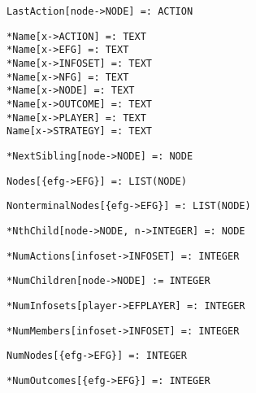 \protect \large \begin{verbatim} 
LastAction[node->NODE] =: ACTION
\end{verbatim}\normalsize

\protect \large \begin{verbatim}
*Name[x->ACTION] =: TEXT
*Name[x->EFG] =: TEXT
*Name[x->INFOSET] =: TEXT
*Name[x->NFG] =: TEXT
*Name[x->NODE] =: TEXT
*Name[x->OUTCOME] =: TEXT
*Name[x->PLAYER] =: TEXT
Name[x->STRATEGY] =: TEXT
\end{verbatim}\normalsize

\protect \large \begin{verbatim}
*NextSibling[node->NODE] =: NODE
\end{verbatim}\normalsize

\protect \large \begin{verbatim} 
Nodes[{efg->EFG}] =: LIST(NODE)
\end{verbatim}\normalsize

\protect \large \begin{verbatim} 
NonterminalNodes[{efg->EFG}] =: LIST(NODE)
\end{verbatim}\normalsize

\protect \large \begin{verbatim} 
*NthChild[node->NODE, n->INTEGER] =: NODE
\end{verbatim}\normalsize

\protect \large \begin{verbatim}
*NumActions[infoset->INFOSET] =: INTEGER
\end{verbatim}\normalsize

\protect \large \begin{verbatim}
*NumChildren[node->NODE] := INTEGER
\end{verbatim}\normalsize

\protect \large \begin{verbatim}
*NumInfosets[player->EFPLAYER] =: INTEGER
\end{verbatim}\normalsize

\protect \large \begin{verbatim}
*NumMembers[infoset->INFOSET] =: INTEGER
\end{verbatim}\normalsize

\protect \large \begin{verbatim}
NumNodes[{efg->EFG}] =: INTEGER
\end{verbatim}\normalsize

\protect \large \begin{verbatim}
*NumOutcomes[{efg->EFG}] =: INTEGER
\end{verbatim} \normalsize

